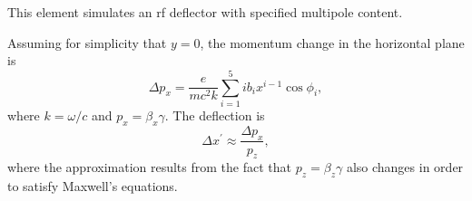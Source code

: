 This element simulates an rf deflector with specified multipole content.

Assuming for simplicity that $y=0$, the momentum change in the horizontal plane is
\begin{equation}
\Delta p_x = \frac{e}{m c^2 k} \sum_{i=1}^5 i b_i x^{i-1} \cos \phi_i,
\end{equation}
where $k = \omega/c$ and $p_x = \beta_x \gamma$.
The deflection is
\begin{equation}
\Delta x^\prime  \approx \frac{\Delta p_x}{p_z},
\end{equation}
where the approximation results from the fact that $p_z=\beta_z \gamma$ also changes in order
to satisfy Maxwell's equations.

